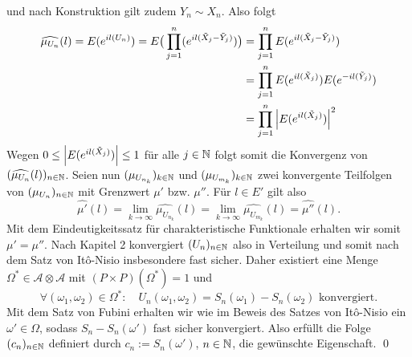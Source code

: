 \begin{proof*}
    und nach Konstruktion gilt zudem $Y_n \sim X_n$. Also folgt 
    \begin{align*}
        \widehat{\mu_{U_n}}(l) = E(e^{il(U_n)}) = E\big(\prod_{j=1}^n(e^{il(\tilde{X}_j-\tilde{Y}_j)})\big) &= \prod_{j=1}^n E(e^{il(\tilde{X}_j-\tilde{Y}_j)}) \\\ 
                                                                                                            &= \prod_{j=1}^n E(e^{il(\tilde{X}_j)})E(e^{-il(\tilde{Y}_j)}) \\\
                                                                                                            &= \prod_{j=1}^n \abs{E(e^{il(\tilde{X}_j)})}^2
    \end{align*}
    Wegen $0 \leq \left| E(e^{il(\tilde{X}_j)}) \right| \leq 1$ für alle $j \in \mathbb{N}$ folgt somit die Konvergenz von $(\widehat{\mu_{U_n}}(l))_{n \in \mathbb{N}}$. 
    Seien nun $(\mu_{U_{n_k}})_{k \in \mathbb{N}}$ und $(\mu_{U_{m_k}})_{k \in \mathbb{N}}$ zwei konvergente Teilfolgen von $(\mu_{U_n})_{n \in \mathbb{N}}$ mit Grenzwert $\mu'$ bzw. $\mu''$. Für $l \in E'$ gilt also
    $$
        \widehat{\mu'}(l) = \lim_{k \to \infty} \widehat{\mu_{U_{n_k}}}(l) = \lim_{k \to \infty} \widehat{\mu_{U_{m_k}}}(l) = \widehat{\mu''}(l).
    $$
    Mit dem Eindeutigkeitssatz für charakteristische Funktionale erhalten wir somit $\mu' = \mu''$. 
    Nach Kapitel 2 konvergiert $(U_n)_{n \in \mathbb{N}}$ also in Verteilung und somit nach dem Satz von Itô-Nisio insbesondere fast sicher. 
    Daher existiert eine Menge $\Omega^* \in \mathcal{A} \otimes \mathcal{A}$ mit $(P\times P)(\Omega^*) = 1$ und 
    $$
        \forall (\omega_1, \omega_2) \in \Omega^*: \quad U_n(\omega_1, \omega_2) = S_n(\omega_1) - S_n(\omega_2) \text{ konvergiert.}
    $$
    Mit dem Satz von Fubini erhalten wir wie im Beweis des Satzes von Itô-Nisio ein $\omega' \in \Omega$, sodass $S_n - S_n(\omega')$ fast sicher konvergiert. 
    Also erfüllt die Folge $(c_n)_{n \in \mathbb{N}}$ definiert durch $c_n := S_n(\omega')$, $n \in \mathbb{N}$, die gewünschte Eigenschaft. \qed

\end{proof*}

